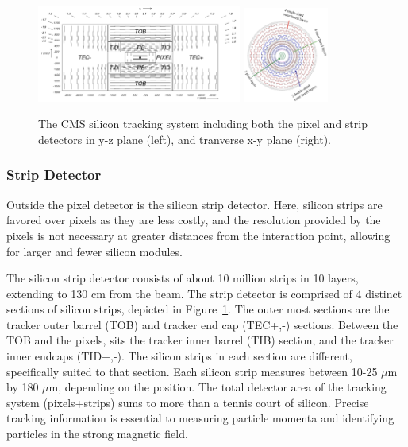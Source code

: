\begin{figure}[hbtp]
 \begin{center}
   \includegraphics[width=0.6\textwidth]{ch3_figs/tracker_yz.pdf}
   \includegraphics[width=0.25\textwidth]{ch3_figs/tracker_transverse_layers.pdf}
   \caption[The CMS silicon tracking system]{The CMS silicon tracking system including both the pixel and strip detectors in y-z plane (left), and tranverse x-y plane (right).}
   \label{fig:cms_tracker}
 \end{center}
\end{figure}

\subsubsection{Strip Detector}
Outside the pixel detector is the silicon strip detector. Here, silicon strips are favored over pixels as they are less costly, and the resolution provided by the pixels
is not necessary at greater distances from the interaction point, allowing for larger and fewer silicon modules. 

The silicon strip detector consists of about 10 million strips in 10 layers, extending to 130 cm from the beam. 
The strip detector is comprised of 4 distinct sections of silicon strips, depicted in
Figure~\ref{fig:cms_tracker}. The outer most sections are the tracker outer barrel (TOB) and tracker end cap (TEC+,-) sections. 
Between the TOB and the pixels, sits the tracker
inner barrel (TIB) section, and the tracker inner endcaps (TID+,-).
The silicon strips in each section are different, specifically suited to that section.
Each silicon strip measures between 10-25 $\mu$m by 180 $\mu$m, depending on the position. The total detector area of the tracking system (pixels+strips) sums to more than
a tennis court of silicon. Precise tracking information is essential to measuring particle momenta and identifying particles in the strong magnetic field.

